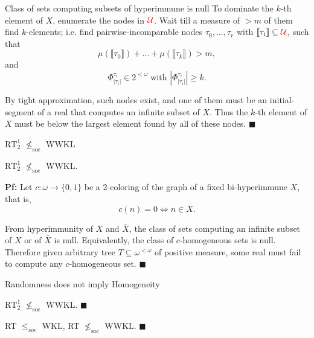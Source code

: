 \begin{frame}{Class of sets computing subsets of hyperimmune is null}
  To dominate the $k$-th element of $X$, enumerate the nodes in
  $\textcolor{red}{\mathcal{U}}$. Wait till a measure of $>m$ of them find
  $k$-elements; i.e. find pairwise-incomparable nodes
  $\tau_0,\ldots,\tau_r$ with $\llbracket\tau_i\rrbracket \subseteq
  \textcolor{red}{\mathcal{U}}$, such that
  \[\mu(\llbracket\tau_0\rrbracket) +\ldots
  +\mu(\llbracket\tau_k\rrbracket) >m,\]
  and
  \[\Phi^{\tau_i}_{|\tau_i|} \in 2^{<\omega}\; \text{with }
  |\Phi^{\tau_i}_{|\tau_i|}|\geq k.\]

  \pause
  \vspace{2em}
  By tight approximation, such nodes exist, and one of them must be an
  initial-segment of a real that computes an infinite subset of $X$. Thus
  the $k$-th element of $X$ must be below the largest element found by all
  of these nodes. $\blacksquare$
\end{frame}

\begin{frame}{$\text{RT}_2^1$ $\nleq_{\text{soc}}$ WWKL}
  \begin{thm}
    $\text{RT}_2^1$ $\nleq_{\text{soc}}$ WWKL.
  \end{thm}

  \pause
  \vspace{1em}
  \textbf{Pf:} Let $c:\omega\rightarrow\{0,1\}$ be a 2-coloring of the
  graph of a fixed bi-hyperimmune $X$, that is,
  \[c(n)=0 \Leftrightarrow n\in X.\]

  \pause
  From hyperimmunity of $X$ and $\bar{X}$, the class of sets computing an
  infinite subset of $X$ or of $\bar{X}$ is null. Equivalently, the class
  of $c$-homogeneous sets is null. Therefore given arbitrary tree
  $T\subseteq\omega^{<\omega}$ of positive measure, some real must fail to
  compute any $c$-homogeneous set. $\blacksquare$
\end{frame}

\begin{frame}{Randomness does not imply Homogeneity}
  \begin{coro}
    $\text{RT}_2^1$ $\nleq_{\text{soc}}$ WWKL. $\blacksquare$
  \end{coro}

  \pause
  \begin{coro}
    RT $\leq_{soc}$ WKL, RT $\nleq_{\text{soc}}$ WWKL. $\blacksquare$
  \end{coro}

  \pause
  \vspace{1em}
  \begin{center}
  \end{center}
\end{frame}
